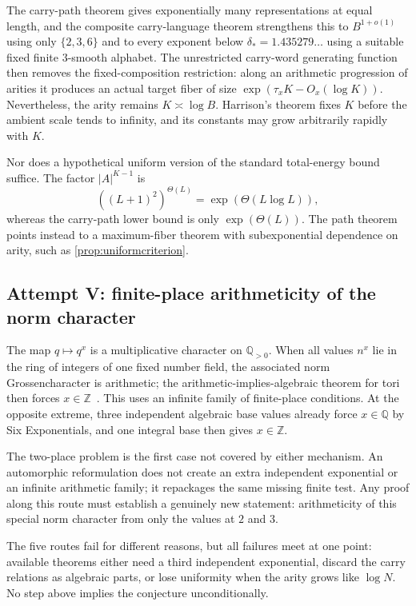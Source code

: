 \documentclass[11pt,oneside]{article}
\theoremstyle{definition}
\newcommand{\Q}{\mathbb{Q}}
\newcommand{\Z}{\mathbb{Z}}
\begin{document}
The carry-path theorem gives exponentially many representations at equal length, and the composite carry-language theorem strengthens this to $B^{1+o(1)}$ using only $\{2,3,6\}$ and to every exponent below $\delta_*=1.435279\ldots$ using a suitable fixed finite $3$-smooth alphabet.  The unrestricted carry-word generating function then removes the fixed-composition restriction: along an arithmetic progression of arities it produces an actual target fiber of size $\exp(\tau_xK-O_x(\log K))$.  Nevertheless, the arity remains $K\asymp\log B$.  Harrison's theorem fixes $K$ before the ambient scale tends to infinity, and its constants may grow arbitrarily rapidly with $K$.

Nor does a hypothetical uniform version of the standard total-energy bound suffice.  The factor $|A|^{K-1}$ is
\[
       ((L+1)^2)^{\Theta(L)}
       =\exp(\Theta(L\log L)),
\]
whereas the carry-path lower bound is only $\exp(\Theta(L))$.  The path theorem points instead to a maximum-fiber theorem with subexponential dependence on arity, such as \cref{prop:uniformcriterion}.

\subsection{Attempt V: finite-place arithmeticity of the norm character}

The map $q\mapsto q^x$ is a multiplicative character on $\Q_{>0}$.  When all values $n^x$ lie in the ring of integers of one fixed number field, the associated norm Grossencharacter is arithmetic; the arithmetic-implies-algebraic theorem for tori then forces $x\in\Z$~\cite{Waldschmidt1982}.  This uses an infinite family of finite-place conditions.  At the opposite extreme, three independent algebraic base values already force $x\in\Q$ by Six Exponentials, and one integral base then gives $x\in\Z$.

The two-place problem is the first case not covered by either mechanism.  An automorphic reformulation does not create an extra independent exponential or an infinite arithmetic family; it repackages the same missing finite test.  Any proof along this route must establish a genuinely new statement: arithmeticity of this special norm character from only the values at $2$ and $3$.

\begin{statusbox}
The five routes fail for different reasons, but all failures meet at one point: available theorems either need a third independent exponential, discard the carry relations as algebraic parts, or lose uniformity when the arity grows like $\log N$.  No step above implies the conjecture unconditionally.
\end{statusbox}
\end{document}
